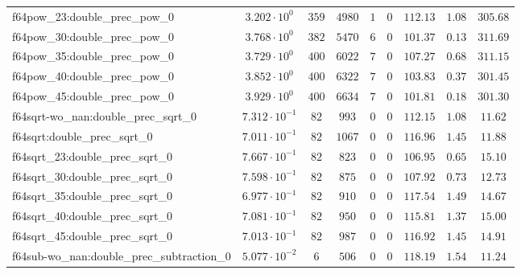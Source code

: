 \begin{tabular}{|l|c|c|c|c|c|c|c|c|}
f64pow\_23:double\_prec\_pow\_0                & $ 3.202 \cdot 10^{0}  $ & $ 359    $ & $ 4980  $ & $ 1   $ & $ 0      $ & $ 112.13      $ & $ 1.08    $ & $ 305.68  $ \\
f64pow\_30:double\_prec\_pow\_0                & $ 3.768 \cdot 10^{0}  $ & $ 382    $ & $ 5470  $ & $ 6   $ & $ 0      $ & $ 101.37      $ & $ 0.13    $ & $ 311.69  $ \\
f64pow\_35:double\_prec\_pow\_0                & $ 3.729 \cdot 10^{0}  $ & $ 400    $ & $ 6022  $ & $ 7   $ & $ 0      $ & $ 107.27      $ & $ 0.68    $ & $ 311.15  $ \\
f64pow\_40:double\_prec\_pow\_0                & $ 3.852 \cdot 10^{0}  $ & $ 400    $ & $ 6322  $ & $ 7   $ & $ 0      $ & $ 103.83      $ & $ 0.37    $ & $ 301.45  $ \\
f64pow\_45:double\_prec\_pow\_0                & $ 3.929 \cdot 10^{0}  $ & $ 400    $ & $ 6634  $ & $ 7   $ & $ 0      $ & $ 101.81      $ & $ 0.18    $ & $ 301.30  $ \\
f64sqrt-wo\_nan:double\_prec\_sqrt\_0          & $ 7.312 \cdot 10^{-1} $ & $ 82     $ & $ 993   $ & $ 0   $ & $ 0      $ & $ 112.15      $ & $ 1.08    $ & $ 11.62   $ \\
f64sqrt:double\_prec\_sqrt\_0                  & $ 7.011 \cdot 10^{-1} $ & $ 82     $ & $ 1067  $ & $ 0   $ & $ 0      $ & $ 116.96      $ & $ 1.45    $ & $ 11.88   $ \\
f64sqrt\_23:double\_prec\_sqrt\_0              & $ 7.667 \cdot 10^{-1} $ & $ 82     $ & $ 823   $ & $ 0   $ & $ 0      $ & $ 106.95      $ & $ 0.65    $ & $ 15.10   $ \\
f64sqrt\_30:double\_prec\_sqrt\_0              & $ 7.598 \cdot 10^{-1} $ & $ 82     $ & $ 875   $ & $ 0   $ & $ 0      $ & $ 107.92      $ & $ 0.73    $ & $ 12.73   $ \\
f64sqrt\_35:double\_prec\_sqrt\_0              & $ 6.977 \cdot 10^{-1} $ & $ 82     $ & $ 910   $ & $ 0   $ & $ 0      $ & $ 117.54      $ & $ 1.49    $ & $ 14.67   $ \\
f64sqrt\_40:double\_prec\_sqrt\_0              & $ 7.081 \cdot 10^{-1} $ & $ 82     $ & $ 950   $ & $ 0   $ & $ 0      $ & $ 115.81      $ & $ 1.37    $ & $ 15.00   $ \\
f64sqrt\_45:double\_prec\_sqrt\_0              & $ 7.013 \cdot 10^{-1} $ & $ 82     $ & $ 987   $ & $ 0   $ & $ 0      $ & $ 116.92      $ & $ 1.45    $ & $ 14.91   $ \\
f64sub-wo\_nan:double\_prec\_subtraction\_0    & $ 5.077 \cdot 10^{-2} $ & $ 6      $ & $ 506   $ & $ 0   $ & $ 0      $ & $ 118.19      $ & $ 1.54    $ & $ 11.24   $ \\

\end{tabular}
